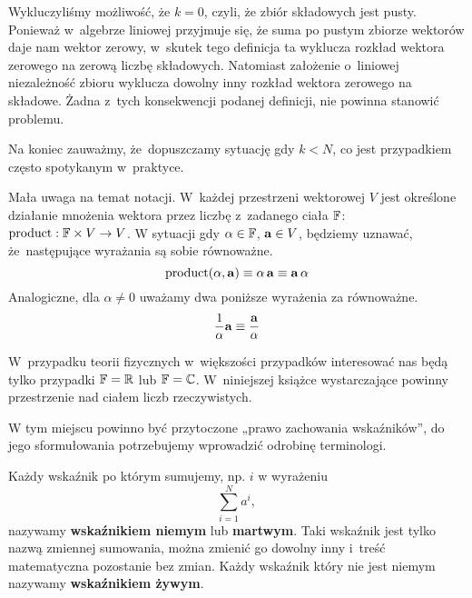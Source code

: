 \documentclass[a4paper,11pt]{article}
\begin{document}
Wykluczyliśmy możliwość, że $k = 0$, czyli, że zbiór składowych jest pusty.
Ponieważ w~algebrze liniowej przyjmuje się, że suma po pustym zbiorze
wektorów daje nam wektor zerowy, w~skutek tego definicja ta wyklucza rozkład
wektora zerowego na zerową liczbę składowych. Natomiast założenie o~liniowej
niezależność zbioru wyklucza dowolny inny rozkład wektora zerowego na
składowe. Żadna z~tych konsekwencji podanej definicji, nie powinna stanowić
problemu.

Na koniec zauważmy, że~dopuszczamy sytuację gdy $k < N$, co jest przypadkiem
często spotykanym w~praktyce.

\vspace{\spaceFour}





\noindent
{} Mała uwaga na temat notacji. W~każdej przestrzeni wektorowej $V$
jest określone działanie mnożenia wektora przez liczbę z~zadanego
ciała $\mathbb{F}$: $\textrm{product} : \mathbb{F} \times V \to V$. W sytuacji gdy $\alpha \in \mathbb{F}$,
$\mathbf{a} \in V$, będziemy uznawać, że~następujące wyrażania są sobie
równoważne.
\begin{equation}
  \label{eq:SkalmierskiMechanika-03}
  \textrm{product}( \alpha, \mathbf{a} ) \equiv \alpha \, \mathbf{a} \equiv \mathbf{a} \, \alpha
\end{equation}
Analogiczne, dla $\alpha \neq 0$ uważamy dwa poniższe wyrażenia za równoważne.
\begin{equation}
  \label{eq:SkalmierskiMechanika-04}
  \frac{ 1 }{ \alpha } \mathbf{a} \equiv \frac{ \mathbf{a} }{ \alpha }
\end{equation}

W~przypadku teorii fizycznych w~większości przypadków interesować nas będą
tylko przypadki $\mathbb{F} = \mathbb{R}$ lub $\mathbb{F} = \mathbb{C}$. W~niniejszej książce
wystarczające powinny przestrzenie nad ciałem liczb rzeczywistych.

\vspace{\spaceFour}





\noindent
{} W tym miejscu powinno być przytoczone „prawo zachowania
wskaźników”, do jego sformułowania potrzebujemy wprowadzić odrobinę
terminologi.

Każdy wskaźnik po którym sumujemy, np. $i$ w wyrażeniu
\begin{equation}
  \label{eq:SkalmierskiMechanika-05}
  \sum_{ i = 1 }^{ N } a^{ i },
\end{equation}
nazywamy \textbf{wskaźnikiem niemym} lub \textbf{martwym}. Taki wskaźnik
jest tylko nazwą zmiennej sumowania, można zmienić go dowolny inny i~treść
matematyczna pozostanie bez zmian. Każdy wskaźnik który nie jest niemym
nazywamy \textbf{wskaźnikiem żywym}.
\end{document}
